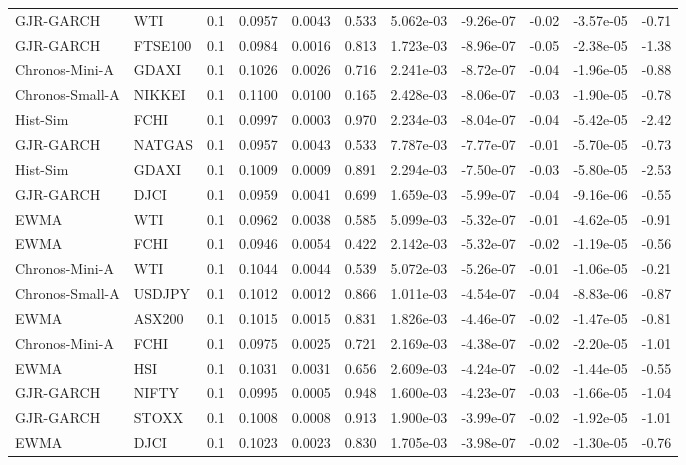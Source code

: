 \begin{tabular}{llrrrrrrrrr}
GJR-GARCH & WTI & 0.1 & 0.0957 & 0.0043 & 0.533 & 5.062e-03 & -9.26e-07 & -0.02 & -3.57e-05 & -0.71 \\
GJR-GARCH & FTSE100 & 0.1 & 0.0984 & 0.0016 & 0.813 & 1.723e-03 & -8.96e-07 & -0.05 & -2.38e-05 & -1.38 \\
Chronos-Mini-A & GDAXI & 0.1 & 0.1026 & 0.0026 & 0.716 & 2.241e-03 & -8.72e-07 & -0.04 & -1.96e-05 & -0.88 \\
Chronos-Small-A & NIKKEI & 0.1 & 0.1100 & 0.0100 & 0.165 & 2.428e-03 & -8.06e-07 & -0.03 & -1.90e-05 & -0.78 \\
Hist-Sim & FCHI & 0.1 & 0.0997 & 0.0003 & 0.970 & 2.234e-03 & -8.04e-07 & -0.04 & -5.42e-05 & -2.42 \\
GJR-GARCH & NATGAS & 0.1 & 0.0957 & 0.0043 & 0.533 & 7.787e-03 & -7.77e-07 & -0.01 & -5.70e-05 & -0.73 \\
Hist-Sim & GDAXI & 0.1 & 0.1009 & 0.0009 & 0.891 & 2.294e-03 & -7.50e-07 & -0.03 & -5.80e-05 & -2.53 \\
GJR-GARCH & DJCI & 0.1 & 0.0959 & 0.0041 & 0.699 & 1.659e-03 & -5.99e-07 & -0.04 & -9.16e-06 & -0.55 \\
EWMA & WTI & 0.1 & 0.0962 & 0.0038 & 0.585 & 5.099e-03 & -5.32e-07 & -0.01 & -4.62e-05 & -0.91 \\
EWMA & FCHI & 0.1 & 0.0946 & 0.0054 & 0.422 & 2.142e-03 & -5.32e-07 & -0.02 & -1.19e-05 & -0.56 \\
Chronos-Mini-A & WTI & 0.1 & 0.1044 & 0.0044 & 0.539 & 5.072e-03 & -5.26e-07 & -0.01 & -1.06e-05 & -0.21 \\
Chronos-Small-A & USDJPY & 0.1 & 0.1012 & 0.0012 & 0.866 & 1.011e-03 & -4.54e-07 & -0.04 & -8.83e-06 & -0.87 \\
EWMA & ASX200 & 0.1 & 0.1015 & 0.0015 & 0.831 & 1.826e-03 & -4.46e-07 & -0.02 & -1.47e-05 & -0.81 \\
Chronos-Mini-A & FCHI & 0.1 & 0.0975 & 0.0025 & 0.721 & 2.169e-03 & -4.38e-07 & -0.02 & -2.20e-05 & -1.01 \\
EWMA & HSI & 0.1 & 0.1031 & 0.0031 & 0.656 & 2.609e-03 & -4.24e-07 & -0.02 & -1.44e-05 & -0.55 \\
GJR-GARCH & NIFTY & 0.1 & 0.0995 & 0.0005 & 0.948 & 1.600e-03 & -4.23e-07 & -0.03 & -1.66e-05 & -1.04 \\
GJR-GARCH & STOXX & 0.1 & 0.1008 & 0.0008 & 0.913 & 1.900e-03 & -3.99e-07 & -0.02 & -1.92e-05 & -1.01 \\
EWMA & DJCI & 0.1 & 0.1023 & 0.0023 & 0.830 & 1.705e-03 & -3.98e-07 & -0.02 & -1.30e-05 & -0.76 \\

\end{tabular}
